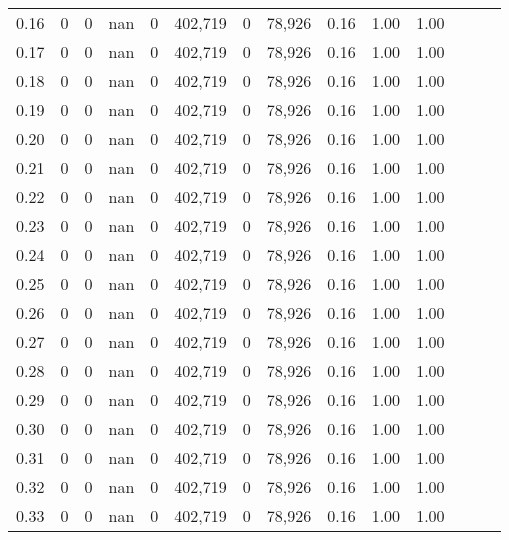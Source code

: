 \begin{tabular}{rrrrrrrrrrrrrr}
0.16 &       0 &       0 &   nan &        0 &  402,719 &       0 &  78,926 &  0.16 &  1.00 &      1.00 \\
0.17 &       0 &       0 &   nan &        0 &  402,719 &       0 &  78,926 &  0.16 &  1.00 &      1.00 \\
0.18 &       0 &       0 &   nan &        0 &  402,719 &       0 &  78,926 &  0.16 &  1.00 &      1.00 \\
0.19 &       0 &       0 &   nan &        0 &  402,719 &       0 &  78,926 &  0.16 &  1.00 &      1.00 \\
0.20 &       0 &       0 &   nan &        0 &  402,719 &       0 &  78,926 &  0.16 &  1.00 &      1.00 \\
0.21 &       0 &       0 &   nan &        0 &  402,719 &       0 &  78,926 &  0.16 &  1.00 &      1.00 \\
0.22 &       0 &       0 &   nan &        0 &  402,719 &       0 &  78,926 &  0.16 &  1.00 &      1.00 \\
0.23 &       0 &       0 &   nan &        0 &  402,719 &       0 &  78,926 &  0.16 &  1.00 &      1.00 \\
0.24 &       0 &       0 &   nan &        0 &  402,719 &       0 &  78,926 &  0.16 &  1.00 &      1.00 \\
0.25 &       0 &       0 &   nan &        0 &  402,719 &       0 &  78,926 &  0.16 &  1.00 &      1.00 \\
0.26 &       0 &       0 &   nan &        0 &  402,719 &       0 &  78,926 &  0.16 &  1.00 &      1.00 \\
0.27 &       0 &       0 &   nan &        0 &  402,719 &       0 &  78,926 &  0.16 &  1.00 &      1.00 \\
0.28 &       0 &       0 &   nan &        0 &  402,719 &       0 &  78,926 &  0.16 &  1.00 &      1.00 \\
0.29 &       0 &       0 &   nan &        0 &  402,719 &       0 &  78,926 &  0.16 &  1.00 &      1.00 \\
0.30 &       0 &       0 &   nan &        0 &  402,719 &       0 &  78,926 &  0.16 &  1.00 &      1.00 \\
0.31 &       0 &       0 &   nan &        0 &  402,719 &       0 &  78,926 &  0.16 &  1.00 &      1.00 \\
0.32 &       0 &       0 &   nan &        0 &  402,719 &       0 &  78,926 &  0.16 &  1.00 &      1.00 \\
0.33 &       0 &       0 &   nan &        0 &  402,719 &       0 &  78,926 &  0.16 &  1.00 &      1.00 \\

\end{tabular}
